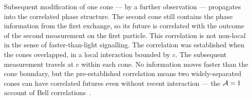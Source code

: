 Subsequent modification of one cone — by a further observation — propagates
into the correlated phase structure.  The second cone still contains the
phase information from the first exchange, so its future is correlated
with the outcome of the second measurement on the first particle.  This
correlation is not non-local in the sense of faster-than-light signalling.
The correlation was established when the cones overlapped, in a local
interaction bounded by $c$.  The subsequent measurement travels at $c$
within each cone.  No information moves faster than the cone boundary,
but the pre-established correlation means two widely-separated cones can
have correlated futures even without recent interaction — the $\mathcal{A}=1$
account of Bell correlations~\cite{bell1964}.
